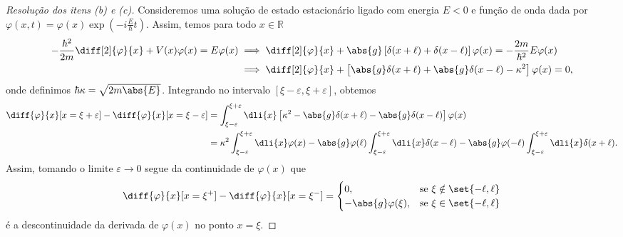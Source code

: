 \begin{proof}[Resolução dos itens (b) e (c)]
    Consideremos uma solução de estado estacionário ligado com energia \(E < 0\) e função de onda dada por \(\varphi(x,t) = \varphi(x) \exp(-i\frac{E}{\hbar}t)\). Assim, temos para todo \(x \in \mathbb{R}\)
    \begin{align*}
        -\frac{\hbar^2}{2m} \diff[2]{\varphi}{x} + V(x)\varphi(x) = E \varphi(x)
        &\implies \diff[2]{\varphi}{x} + \abs{g}\left[\delta(x + \ell) + \delta(x - \ell)\right]\varphi(x) = -\frac{2m}{\hbar^2}E \varphi(x)\\
        &\implies \diff[2]{\varphi}{x} + \left[\abs{g}\delta(x + \ell) + \abs{g}\delta(x - \ell) - \kappa^2\right]\varphi(x) = 0,
    \end{align*}
    onde definimos \(\hbar \kappa = \sqrt{2m \abs{E}}\). Integrando no intervalo \([\xi - \varepsilon, \xi + \varepsilon]\), obtemos
    \begin{align*}
        \diff{\varphi}{x}[x = \xi + \varepsilon] - \diff{\varphi}{x}[x = \xi - \varepsilon]
        &= \int_{\xi - \varepsilon}^{\xi + \varepsilon} \dli{x}\left[\kappa^2 - \abs{g}\delta(x + \ell) - \abs{g}\delta(x - \ell)\right]\varphi(x)\\
        &= \kappa^2 \int_{\xi - \varepsilon}^{\xi + \varepsilon}\dli{x} \varphi(x) - \abs{g}\varphi(\ell) \int_{\xi - \varepsilon}^{\xi + \varepsilon}\dli{x} \delta(x - \ell) - \abs{g}\varphi(-\ell) \int_{\xi - \varepsilon}^{\xi + \varepsilon} \dli{x} \delta(x + \ell).
    \end{align*}
    Assim, tomando o limite \(\varepsilon \to 0\) segue da continuidade de \(\varphi(x)\) que
    \begin{equation*}
        \diff{\varphi}{x}[x = \xi^+] - \diff{\varphi}{x}[x = \xi^-] = \begin{cases}
            0, & \text{se }\xi \notin \set{- \ell, \ell}\\
            -\abs{g}\varphi(\xi),& \text{se }\xi \in\set{- \ell, \ell}
        \end{cases}
    \end{equation*}
    é a descontinuidade da derivada de \(\varphi(x)\) no ponto \(x = \xi\).


\end{proof}
